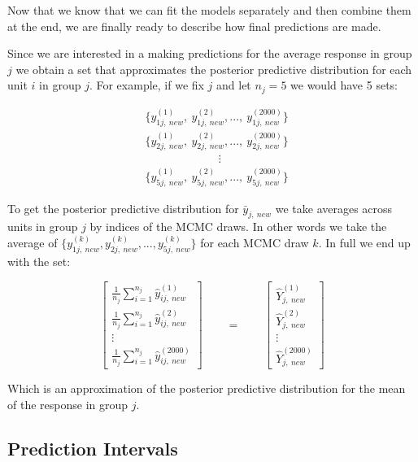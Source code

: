 \documentclass[12pt,twoside]{reedthesis}
\begin{document}
Now that we know that we can fit the models separately and then combine them at the end, we are finally ready to describe how final predictions are made.

Since we are interested in a making predictions for the average response in group \(j\) we obtain a set that approximates the posterior predictive distribution for each unit \(i\) in group \(j\). For example, if we fix \(j\) and let \(n_j = 5\) we would have 5 sets:

\[
\begin{aligned}
&\Big\{y_{1j , \ new}^{(1)}, \ y_{1j, \ new}^{(2)}, ..., \ y_{1j, \ new}^{(2000)}\Big\} \\
&\Big\{y_{2j , \ new}^{(1)}, \ y_{2j, \ new}^{(2)}, ...,  \ y_{2j, \ new}^{(2000)}\Big\} \\
& \qquad \qquad \qquad \ \   \vdots \\
&\Big\{y_{5j , \ new}^{(1)}, \ y_{5j, \ new}^{(2)}, ..., \ y_{5j, \ new}^{(2000)}\Big\}
\end{aligned}
\]

To get the posterior predictive distribution for \(\bar{y}_{j, \ new}\) we take averages across units in group \(j\) by indices of the MCMC draws. In other words we take the average of \(\Big\{y_{1j, \ new}^{(k)}, y_{2j, \ new}^{(k)}, ... , y_{5j, \ new}^{(k)}\Big\}\) for each MCMC draw \(k\). In full we end up with the set:

\[
\begin{bmatrix}
\frac{1}{n_j} \sum_{i = 1}^{n_j}\hat{y}_{ij, \ new}^{(1)} \\
\frac{1}{n_j} \sum_{i = 1}^{n_j}\hat{y}_{ij, \ new}^{(2)} \\
\vdots \\
\frac{1}{n_j} \sum_{i = 1}^{n_j}\hat{y}_{ij, \ new}^{(2000)}
\end{bmatrix} \qquad = \qquad 
\begin{bmatrix}
\hat{Y}_{j, \ new}^{(1)} \\
\hat{Y}_{j, \ new}^{(2)} \\
\vdots \\
\hat{Y}_{j, \ new}^{(2000)}
\end{bmatrix}
\]

Which is an approximation of the posterior predictive distribution for the mean of the response in group \(j\).

\hypertarget{wraptwo}{%
\subsection{Prediction Intervals}\label{wraptwo}}
\end{document}
